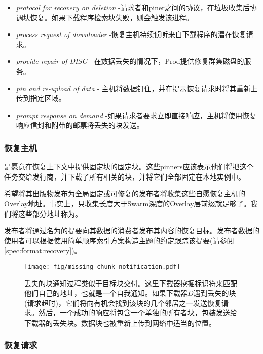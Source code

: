 \begin{itemize}
\item \emph{protocol for recovery on deletion} -请求者和piner之间的协议，在垃圾收集后协调块恢复。如果下载程序检索块失败，则会触发该进程。
\item \emph{process request of downloader} -恢复主机持续侦听来自下载程序的潜在恢复请求。
\item \emph{provide repair of DISC} - 
在数据丢失的情况下，Prod提供修复群集磁盘的服务。
\item \emph{pin and re-upload of data} -     
主机将数据钉住，并在提示恢复请求时将其重新上传到指定区域。 
\item \emph{prompt response on demand} -如果请求者要求立即直接响应，主机将使用恢复响应信封和附带的邮票将丢失的块发送。
\end{itemize}

\subsubsection{恢复主机}

是愿意在恢复上下文中提供固定块的固定块。这些pinners应该表示他们将把这个任务交给发行商，并下载了所有相关的块，并将它们全部固定在本地实例中。 

希望将其出版物发布为全局固定或可修复的发布者将收集这些自愿恢复主机的Overlay地址。事实上，只收集长度大于Swarm深度的Overlay层前缀就足够了。我们将这些部分地址称为。

发布者将通过名为的提要向其数据的消费者发布其内容的恢复目标。发布者数据的使用者可以根据使用简单顺序索引方案构造主题的约定跟踪该提要(请参阅\ref{spec:format:recovery})。 

\begin{figure}[htbp]
\centering
\texttt{[image: fig/missing-chunk-notification.pdf]} \caption[缺少块通知进程\statusgreen]{丢失的块通知过程类似于目标块交付。这里下载器挖掘标识符来匹配他们自己的地址，也就是一个自我通知。如果下载器$D$遇到丢失的块(请求超时)，它们将向有机会找到该块的几个邻居之一发送恢复请求。然后，一个成功的响应将包含一个单独的所有者块，包装发送给下载器的丢失块。数据块也被重新上传到网络中适当的位置。}
\label{fig:missing-chunk-notification}
\end{figure}

\subsubsection{恢复请求}

